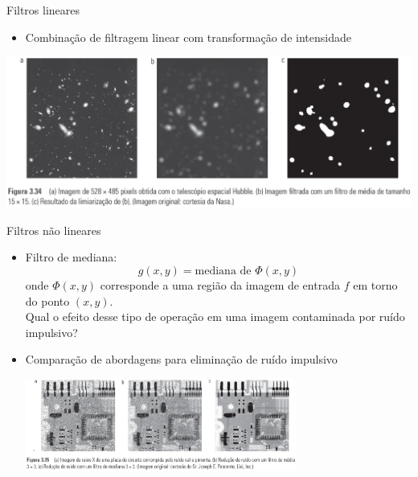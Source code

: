       \begin{slide}[toc=]{Filtros lineares}
      \begin{itemize}
       \item Combinação de filtragem linear com transformação de intensidade
       
      \end{itemize}
      \begin{center}
          \includegraphics[width=\textwidth]{figs/fig0334}
      \end{center}
      \end{slide}

      \begin{slide}[toc=]{Filtros não lineares}
         \begin{itemize}[type=1]
            \item Filtro de mediana: 
            \begin{equation*}
               g(x,y)=\text{mediana de }\Phi(x,y)
            \end{equation*}
            onde $\Phi(x,y)$ corresponde a uma região da imagem de entrada $f$ em torno do ponto $(x,y)$.\\ \vspace{0.5cm}Qual o efeito desse tipo de operação em uma imagem contaminada por ruído impulsivo?
            \item Comparação de abordagens para eliminação de ruído impulsivo
         \begin{center}
          \includegraphics[width=0.7\textwidth]{figs/fig0335}
      \end{center}
         \end{itemize}
      \end{slide}
      
